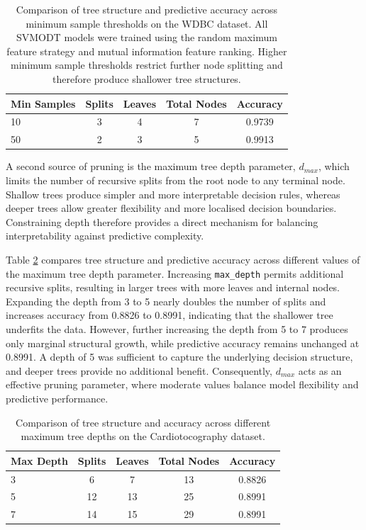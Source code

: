 \begin{table}
\centering
\caption{\label{tab:min-split-table-latex}Comparison of tree structure and predictive accuracy across minimum sample thresholds on the WDBC dataset. All SVMODT models were trained using the random maximum feature strategy and mutual information feature ranking. Higher minimum sample thresholds restrict further node splitting and therefore produce shallower tree structures.}
\centering
\fontsize{8}{10}\selectfont
\begin{tabular}[t]{l|c|c|c|c}
\hline
Min Samples & Splits & Leaves & Total Nodes & Accuracy\\
\hline
10 & 3 & 4 & 7 & 0.9739\\
\hline
50 & 2 & 3 & 5 & 0.9913\\
\hline
\end{tabular}
\end{table}

A second source of pruning is the maximum tree depth parameter, \(d_{max}\), which limits the number of recursive splits from the root node to any terminal node. Shallow trees produce simpler and more interpretable decision rules, whereas deeper trees allow greater flexibility and more localised decision boundaries. Constraining depth therefore provides a direct mechanism for balancing interpretability against predictive complexity.

Table \ref{tab:max-depth-table-latex} compares tree structure and predictive accuracy across different values of the maximum tree depth parameter. Increasing \texttt{max\_depth} permits additional recursive splits, resulting in larger trees with more leaves and internal nodes. Expanding the depth from 3 to 5 nearly doubles the number of splits and increases accuracy from 0.8826 to 0.8991, indicating that the shallower tree underfits the data. However, further increasing the depth from 5 to 7 produces only marginal structural growth, while predictive accuracy remains unchanged at 0.8991. A depth of 5 was sufficient to capture the underlying decision structure, and deeper trees provide no additional benefit. Consequently, \(d_{max}\) acts as an effective pruning parameter, where moderate values balance model flexibility and predictive performance.

\begin{table}
\centering
\caption{\label{tab:max-depth-table-latex}Comparison of tree structure and accuracy across different maximum tree depths on the Cardiotocography dataset.}
\centering
\fontsize{8}{10}\selectfont
\begin{tabular}[t]{l|c|c|c|c}
\hline
Max Depth & Splits & Leaves & Total Nodes & Accuracy\\
\hline
3 & 6 & 7 & 13 & 0.8826\\
\hline
5 & 12 & 13 & 25 & 0.8991\\
\hline
7 & 14 & 15 & 29 & 0.8991\\
\hline
\end{tabular}
\end{table}


